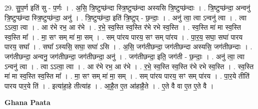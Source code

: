 \documentclass[17pt]{extarticle}
\begin{document}
29. सु॒प॒र्ण इति॑ सु - प॒र्णः । . अ॒सि॒ त्रि॒ष्टुप्छ॑न्दा स्त्रि॒ष्टुप्छ॑न्दा अस्यसि त्रि॒ष्टुप्छ॑न्दाः । . त्रि॒ष्टुप्छ॑न्दा॒ अन्वनु॑ त्रि॒ष्टुप्छ॑न्दा स्त्रि॒ष्टुप्छ॑न्दा॒ अनु॑ । . त्रि॒ष्टुप्छ॑न्दा॒ इति॑ त्रि॒ष्टुप् - छ॒न्दाः॒ । . अनु॑ त्वा॒ त्वा ऽन्वनु॑ त्वा । . त्वा ऽऽत्वा॒ त्वा । . आ र॑भे रभ॒ आ र॑भे । . र॒भे॒ स्व॒स्ति स्व॒स्ति र॑भे रभे स्व॒स्ति । . स्व॒स्ति मा॑ मा स्व॒स्ति स्व॒स्ति मा᳚ । . मा॒ सꣳ सम् मा॑ मा॒ सम् । . सम् पा॑रय पारय॒ सꣳ सम् पा॑रय । . पा॒र॒य॒ सघा॒ सघा॑ पारय पारय॒ सघा᳚ । . सघा᳚ ऽस्यसि॒ सघा॒ सघा॑ ऽसि । . अ॒सि॒ जग॑तीछन्दा॒ जग॑तीछन्दा अस्यसि॒ जग॑तीछन्दाः । . जग॑तीछन्दा॒ अन्वनु॒ जग॑तीछन्दा॒ जग॑तीछन्दा॒ अनु॑ । . जग॑तीछन्दा॒ इति॒ जग॑ती - छ॒न्दाः॒ । . अनु॑ त्वा॒ त्वा ऽन्वनु॑ त्वा । . त्वा ऽऽत्वा॒ त्वा । . आ र॑भे रभ॒ आ र॑भे । . र॒भे॒ स्व॒स्ति स्व॒स्ति र॑भे रभे स्व॒स्ति । . स्व॒स्ति मा॑ मा स्व॒स्ति स्व॒स्ति मा᳚ । . मा॒ सꣳ सम् मा॑ मा॒ सम् । . सम् पा॑रय पारय॒ सꣳ सम् पा॑रय । . पा॒र॒ये तीति॑ पारय पार॒ये ति॑ । . इत्या॑हा॒हे तीत्या॑ह । . आ॒है॒त ए॒त आ॑हाहै॒ते । . ए॒ते वै वा ए॒त ए॒ते वै । \newline

\textbf{Ghana Paata } \newline
\end{document}
